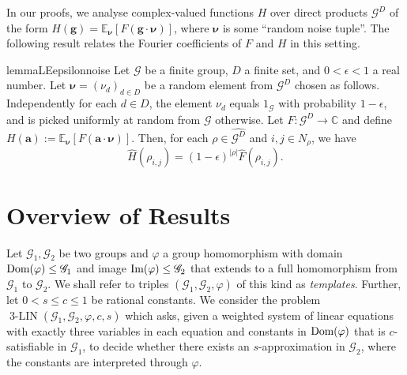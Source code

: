 \documentclass[a4paper,11pt]{article}
\theoremstyle{definition}
\newcommand{\tuple}[1]{{\mathbf{#1}}}
\newcommand{\ex}[1]{\mathbb{E}_{#1}}
\newcommand{\gr}{\mathscr{G}}
\newcommand{\ba}{\mathbf{a}}
\newcommand{\im}{\textnormal{Im}}
\newcommand{\dom}{\textnormal{Dom}}
\newcommand{\groupid}{1}
\newcommand{\eq}{\ensuremath{\operatorname{3-LIN}}}
\begin{document}
In our proofs, we analyse complex-valued functions $H$ over direct products $\gr^D$ of the form 
$H(\tuple{g})= \ex{\bm{\nu}}[F(\tuple{g}\cdot \bm{\nu})]$, where $\bm{\nu}$ is some ``random noise tuple''. The following result relates the Fourier coefficients of $F$ and $H$ in this setting.

\begin{restatable}{lemma}{LEepsilonnoise}
  \label{le:epsilon-noise}
    Let $\gr$ be a finite group, $D$ a finite set, and $0<\epsilon<1$ a real number. Let $\bm{\nu}=(\nu_d)_{d\in D}$ be a random element from $\gr^D$ chosen as follows. Independently for each $d\in D$, the element $\nu_d$ equals $\groupid_\gr$ with probability $1-\epsilon$, and is picked uniformly at random from $\gr$ otherwise.     
    Let $F:\gr^D\to\mathbb{C}$ and define $H(\ba):= \ex{\bm{\nu}}[F(\ba\cdot \bm{\nu})]$. Then, for each $\rho\in \widehat{\gr^D}$ and $i,j\in N_\rho$, we have
    \[
    \widehat{H}(\rho_{i,j})= 
    (1-\epsilon)^{|\rho|} \widehat{F}(\rho_{i,j}).
    \] 
\end{restatable}






\section{Overview of Results}\label{sec:results}

Let $\gr_1,\gr_2$ be two groups and $\varphi$ a group homomorphism with domain
$\dom(\varphi) \leq \gr_1$ and image $\im(\varphi) \leq \gr_2$ that extends to a full
homomorphism from $\gr_1$ to $\gr_2$.
We shall refer to triples $(\gr_1,\gr_2, \varphi)$ of this kind as \emph{templates}. Further, let $0 < s \leq c \leq 1$ be rational constants. 
We consider the problem $\eq(\gr_1, \gr_2, \varphi,c,s)$ which asks, given a
 weighted system of linear equations with exactly three variables in each equation and
constants in $\dom(\varphi)$ that is $c$-satisfiable in $\gr_1$, to decide whether
there exists an $s$-approximation in $\gr_2$, where the constants are
interpreted through $\varphi$. 
\end{document}
